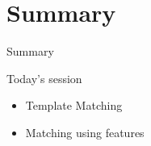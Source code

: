 \documentclass{beamer}
\begin{document}
\section*{Summary}
\begin{frame}{Summary}
    \begin{block}{Today's session}
    \begin{itemize}
        \item Template Matching
        \item Matching using features
    \end{itemize}
    \end{block}
   
\end{frame}
\end{document}
